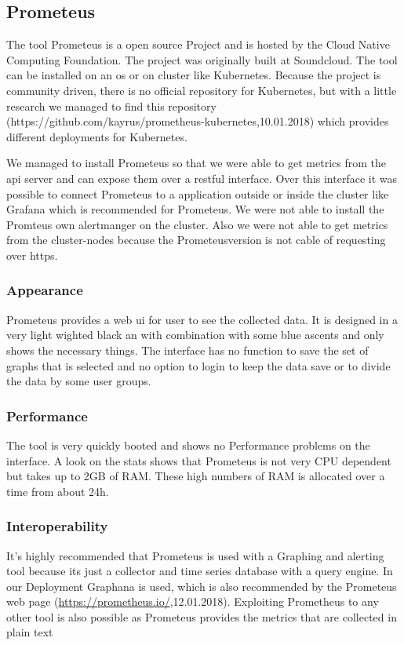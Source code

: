 \subsection{Prometeus}
\label{Toolname} %
The tool Prometeus is a open source Project and is hosted by the Cloud Native Computing Foundation. The project was originally built at Soundcloud. The tool can be installed on an os or on cluster like Kubernetes. Because the project is community driven, there is no official repository for Kubernetes, but with a little research we managed to find this repository (https://github.com/kayrus/prometheus-kubernetes,10.01.2018) which provides different deployments for Kubernetes.

We managed to install Prometeus so that we were able to get metrics from the api server and can expose them over a restful interface. Over this interface it was possible to connect Prometeus to a application outside or inside the cluster like Grafana which is recommended for Prometeus. We were not able to install the Promteus own alertmanger on the cluster. Also we were not able to get metrics from the cluster-nodes because the Prometeusversion is not cable of requesting over https. 
\subsubsection{Appearance}%
Prometeus provides a web ui for user to see the collected data. It is designed in a very light wighted black an with combination with some blue ascents and only shows the necessary things. The interface has no function to save the set of graphs that is selected and no option to login to keep the data save or to divide the data by some user groups.   
\subsubsection{Performance}
The tool is very quickly booted and shows no Performance problems on the interface. A look on the stats shows that Prometeus is not very CPU dependent but takes up to 2GB of RAM. These high numbers of RAM is allocated over a time from about 24h. 
\subsubsection{Interoperability}
It's highly recommended that Prometeus is used with a Graphing and alerting tool because its just a collector and time series database with a query engine. In our Deployment Graphana is used, which is also recommended by the Prometeus web page (\url{https://prometheus.io/},12.01.2018). Exploiting Prometheus to any other tool is also possible as Prometeus provides the metrics that are collected in plain text
